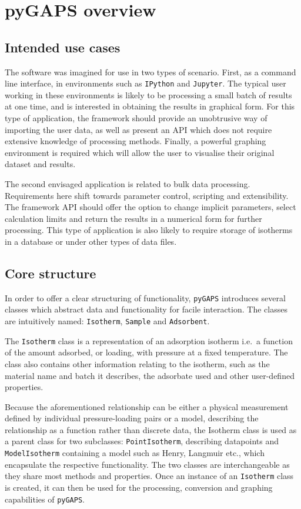 
\section{pyGAPS overview}

\subsection{Intended use cases}

The software was imagined for use in two types of scenario.
First, as a command line interface, in environments such as
\texttt{IPython} and \texttt{Jupyter}. The typical user working
in these environments is likely to be processing a small batch of
results at one time, and is interested in obtaining the results in graphical form.
For this type of application, the framework should provide an unobtrusive
way of importing the user data, as well as present an API which does not require
extensive knowledge of processing methods. Finally, a powerful graphing
environment is required which will allow the user to visualise their original
dataset and results.

The second envisaged application is related to bulk data processing.
Requirements here shift towards parameter control, scripting and extensibility.
The framework API should offer the option to change implicit parameters,
select calculation limits and return the results in a numerical form
for further processing. This type of application is also likely to require storage
of isotherms in a database or under other types of data files.

\subsection{Core structure}

In order to offer a clear structuring of functionality, \texttt{pyGAPS} introduces several
classes which abstract data and functionality for facile interaction. The classes are
intuitively named: \texttt{Isotherm}, \texttt{Sample} and \texttt{Adsorbent}.

The \texttt{Isotherm} class is a representation of an adsorption isotherm i.e.\ a function of
the amount adsorbed, or loading, with pressure at a fixed temperature. The class also contains
other information relating to the isotherm, such as the material name and batch
it describes, the adsorbate used and other user-defined properties.

Because the aforementioned relationship can be either a physical measurement defined by
individual pressure-loading pairs or a model, describing the
relationship as a function rather than discrete data, the Isotherm class is used as
a parent class for two subclasses: \texttt{PointIsotherm}, describing datapoints and
\texttt{ModelIsotherm} containing a model such as Henry, Langmuir etc., which encapsulate
the respective functionality. The two classes are interchangeable as they
share most methods and properties.
Once an instance of an \texttt{Isotherm} class is created, it can then be used for the
processing, conversion and graphing capabilities of \texttt{pyGAPS}.


